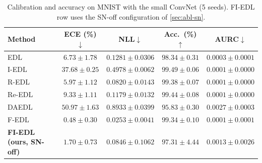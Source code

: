 \documentclass[review,5p,times]{elsarticle}
\begin{document}
\begin{table}[t]
  \centering
  \caption{Calibration and accuracy on MNIST with the small ConvNet
    (5 seeds). FI-EDL row uses the SN-off configuration of
    \autoref{sec:abl-sn}.}
  \label{tab:main-mnist}
  \small
  \begin{tabular}{lcccc}
    \toprule
    Method & ECE (\%)$\downarrow$ & NLL$\downarrow$ & Acc.\ (\%)$\uparrow$ & AURC$\downarrow$ \\
    \midrule
    EDL    & $6.73 \pm 1.78$  & $0.1281 \pm 0.0306$ & $98.34 \pm 0.31$ & $0.0003 \pm 0.0001$ \\
    I-EDL  & $37.68 \pm 0.25$ & $0.4978 \pm 0.0062$ & $99.49 \pm 0.06$ & $0.0001 \pm 0.0000$ \\
    R-EDL  & $5.97 \pm 1.12$  & $0.0820 \pm 0.0143$ & $99.38 \pm 0.07$ & $0.0001 \pm 0.0000$ \\
    Re-EDL & $9.33 \pm 1.11$  & $0.1179 \pm 0.0132$ & $99.44 \pm 0.08$ & $0.0001 \pm 0.0000$ \\
    DAEDL  & $50.97 \pm 1.63$ & $0.8933 \pm 0.0399$ & $95.83 \pm 0.30$ & $0.0027 \pm 0.0003$ \\
    F-EDL  & $\mathbf{0.48 \pm 0.30}$ & $0.0253 \pm 0.0041$ & $99.34 \pm 0.10$ & $0.0001 \pm 0.0001$ \\
    \textbf{FI-EDL (ours, SN-off)} & $1.70 \pm 0.73$ & $0.0846 \pm 0.1062$ & $97.31 \pm 4.44$ & $0.0013 \pm 0.0026$ \\
    \bottomrule
  \end{tabular}
\end{table}
\end{document}
